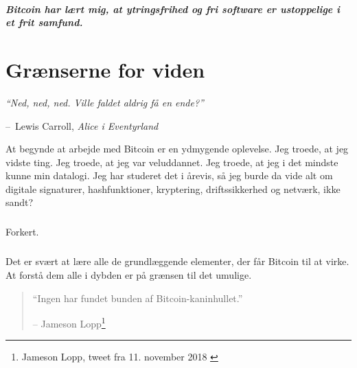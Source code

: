 \documentclass[paper=6in:9in,pagesize=pdftex,headinclude=on,footinclude=on,12pt]{scrbook}
\makeatletter
\newenvironment{chapquote}[2][4em]{\setlength{\@tempdima}{#1}%
   \def\chapquote@author{#2}%
   \parshape 1 \@tempdima \dimexpr\textwidth-2\@tempdima\relax%
   \itshape}{\par\normalfont\hfill--\ \chapquote@author\hspace*{\@tempdima}\par\bigskip}
\makeatother
\begin{document}
\paragraph{Bitcoin har lært mig, at ytringsfrihed og fri software er ustoppelige i et frit samfund.}%
%
%
%
%
%
%
%

\chapter{Grænserne for viden}
\label{les:7}

\begin{chapquote}{Lewis Carroll, \textit{Alice i Eventyrland}} \enquote{Ned, ned, ned. Ville faldet aldrig få en ende?} \end{chapquote}

At begynde at arbejde med Bitcoin er en ydmygende oplevelse. Jeg troede, at jeg vidste ting. Jeg troede, at jeg var veluddannet. Jeg troede, at jeg i det mindste kunne min datalogi. Jeg har studeret det i årevis, så jeg burde da vide alt om digitale signaturer, hashfunktioner, kryptering, driftssikkerhed og netværk, ikke sandt?\paragraph{} Forkert.\paragraph{} Det er svært at lære alle de grundlæggende elementer, der får Bitcoin til at virke. At forstå dem alle i dybden er på grænsen til det umulige.\begin{quotation}\begin{samepage} \enquote{Ingen har fundet bunden af Bitcoin-kaninhullet.} \begin{flushright} -- Jameson Lopp\footnote{Jameson Lopp, tweet fra 11. november 2018 \cite{lopp-tweet}}
\end{flushright}\end{samepage}\end{quotation}
\end{document}
